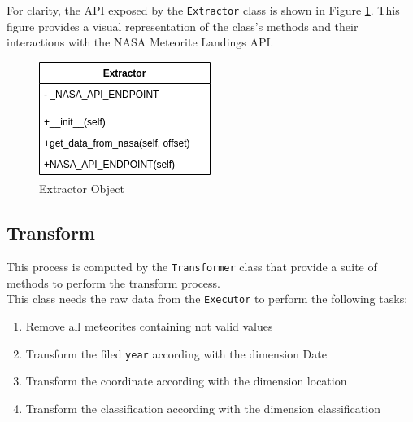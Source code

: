 \documentclass[conference]{IEEEtran}
\begin{document}
	For clarity, the API exposed by the \texttt{Extractor} class is shown in Figure \ref{fig:Extractor}. This figure provides a visual representation of the class's methods and their interactions with the NASA Meteorite Landings API.
	\begin{figure}[htpb]
		\centering
		\includegraphics[width=0.5\columnwidth]{images/Extractor.png}
		\caption{Extractor Object}
		\label{fig:Extractor}
	\end{figure}

	\subsection{Transform}
	This process is computed by the \texttt{Transformer} class that provide a suite of methods to perform the transform process.\\ This class needs the raw data from the \texttt{Executor} to perform the following tasks:
	\begin{enumerate}
		\item Remove all meteorites containing not valid values
		\item Transform the filed \texttt{year} according with the dimension Date
		\item Transform the coordinate according with the dimension location
		\item Transform the classification according with the dimension classification
	\end{enumerate}
	
\end{document}
